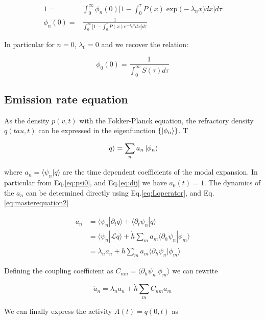 \documentclass[a4paper,11pt,twoside]{article}
\numberwithin{equation}{section}
\begin{document}
\begin{align}
1=&\int_0^{\infty}\phi_n(0)\big[1-\int^\tau_0 P(x) \exp\big(-\lambda_nx)dx\big]d\tau \\
\phi_n(0) =&\frac{1}{\int_0^{\infty}\big[1-\int^\tau_0 P(x) e^{-\lambda_nx}dx\big]d\tau}
\end{align}


In particular for $n=0$, $\lambda_0=0$ and we recover the relation:

\begin{equation}
\phi_0(0) = \frac{1}{\int_0^{\infty}S(\tau)d\tau}
\end{equation}

\subsection{Emission rate equation}

As the density $p(v,t)$ with the Fokker-Planck equation, the refractory density $q(tau,t)$ can be expressed in the eigenfunction  $ \{\ket{\phi_n}\}$. T

\begin{equation}
\label{eq:q}
\ket{q}=\sum_na_n\ket{\phi_n}
\end{equation}

where $a_n=\langle \psi_n | q\rangle$ are the time dependent coefficients of the modal expansion. In particular from Eq.\eqref{eq:psi0}, and Eq.\eqref{eq:dij} we have $a_0(t)=1$. The dynamics of the $a_n$ can be determined directly using Eq.\eqref{eq:Loperator}, and Eq.\eqref{eq:masterequation2}

\begin{align}
\dot{a}_n&=\langle\psi_n|\partial_t q\rangle+\langle\partial_t\psi_n|q\rangle \nonumber \\
&=\langle\psi_n|\mathcal{L}q\rangle+  \dot{h}\sum_ma_m\langle\partial_h\psi_n|\phi_m \rangle \nonumber \\
&=\lambda_n a_n +  \dot{h}\sum_ma_m\langle\partial_h\psi_n|\phi_m \rangle 
\end{align}

Defining the coupling coefficient as $C_{nm}=\langle\partial_h\psi_n|\phi_m \rangle $ we can rewrite

\begin{equation}
\dot{a}_n=\lambda_n a_n +  \dot{h}\sum_mC_{nm}a_m 
\end{equation}



We can finally express the activity $A(t)=q(0,t)$ as
\end{document}
